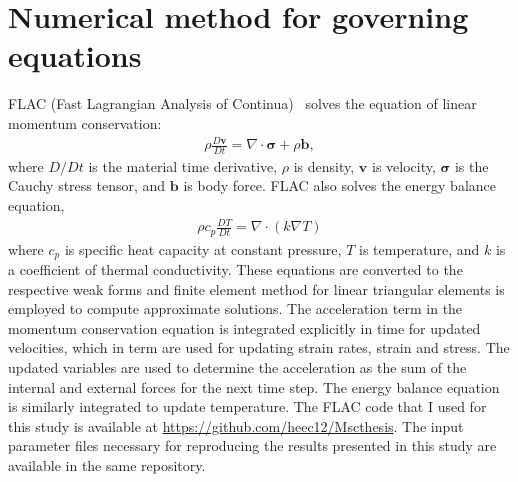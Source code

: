 \documentclass[letterpaper,12pt,notitle]{memphisthesis}                     %
\begin{document}
%
%
%
%

\section{Numerical method for governing equations}
FLAC (Fast Lagrangian Analysis of Continua)~\citep{Cundall1982, Poliakov1993, Lavier2002} solves the equation of linear momentum conservation:
\begin{align}
\rho \frac{D \mathbf{v}}{Dt} = \nabla \cdot \boldsymbol{\sigma} + \rho \mathbf{b},
\end{align}
where $D/Dt$ is the material time derivative, $\rho$ is density, $\mathbf{v}$ is velocity, $\boldsymbol{\sigma}$ is the Cauchy stress tensor, and $\mathbf{b}$ is body force. %
FLAC also solves the energy balance equation,
\begin{align}
\rho c_{p} \frac{D T}{D t} = \nabla \cdot ( k \nabla T)
\end{align}
where $c_{p}$ is specific heat capacity at constant pressure, $T$ is temperature, and $k$ is a coefficient of thermal conductivity. 
%
These equations are converted to the respective weak forms and finite element method for linear triangular elements is employed to compute approximate solutions. The acceleration term in the momentum conservation equation is integrated explicitly in time for updated velocities, which in term are used for updating strain rates, strain and stress. The updated variables are used to determine the acceleration as the sum of the internal and external forces for the next time step. The energy balance equation is similarly integrated to update temperature. The FLAC code that I used for this study is available at \url{https://github.com/heec12/Mscthesis}. The input parameter files necessary for reproducing the results presented in this study are available in the same repository.
\end{document}
